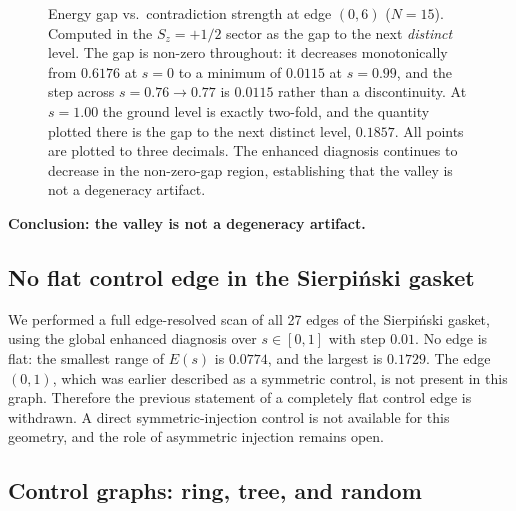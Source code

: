 \documentclass[aps,prb,reprint,superscriptaddress]{revtex4-2}
\begin{document}
\begin{figure}[t]
\centering
{}
\caption{Energy gap vs.\ contradiction strength at edge $(0,6)$ ($N=15$). Computed in the $S_z=+1/2$ sector as the gap to the next \emph{distinct} level. The gap is non-zero throughout: it decreases monotonically from $0.6176$ at $s=0$ to a minimum of $0.0115$ at $s=0.99$, and the step across $s=0.76\to0.77$ is $0.0115$ rather than a discontinuity. At $s=1.00$ the ground level is exactly two-fold, and the quantity plotted there is the gap to the next distinct level, $0.1857$. All points are plotted to three decimals. The enhanced diagnosis continues to decrease in the non-zero-gap region, establishing that the valley is not a degeneracy artifact.}
\label{fig:gap}
\end{figure}

\textbf{Conclusion: the valley is not a degeneracy artifact.}

\subsection{No flat control edge in the Sierpi\'{n}ski gasket}

We performed a full edge-resolved scan of all 27 edges of the Sierpi\'{n}ski gasket, using the global enhanced diagnosis over $s\in[0,1]$ with step $0.01$. No edge is flat: the smallest range of $E(s)$ is $0.0774$, and the largest is $0.1729$. The edge $(0,1)$, which was earlier described as a symmetric control, is not present in this graph. Therefore the previous statement of a completely flat control edge is withdrawn. A direct symmetric-injection control is not available for this geometry, and the role of asymmetric injection remains open.

\subsection{Control graphs: ring, tree, and random}
\end{document}
